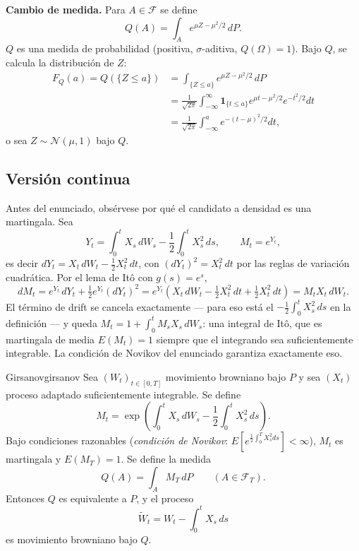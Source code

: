 \documentclass[11pt, a4paper]{article}
\begin{document}
\textbf{Cambio de medida.} Para $A \in \mathcal{F}$ se define
$$ Q(A) = \int_A e^{\mu Z - \mu^2/2} \, dP. $$
$Q$ es una medida de probabilidad (positiva, $\sigma$-aditiva, $Q(\Omega) = 1$). Bajo $Q$,
se calcula la distribución de $Z$:
\begin{align*}
F_Q(a) = Q(\{Z \le a\}) &= \int_{\{Z \le a\}} e^{\mu Z - \mu^2/2} \, dP \\
&= \frac{1}{\sqrt{2\pi}} \int_{-\infty}^\infty \mathbf{1}_{\{t \le a\}} e^{\mu t - \mu^2/2}
e^{-t^2/2} dt \\
&= \frac{1}{\sqrt{2\pi}} \int_{-\infty}^a e^{-(t - \mu)^2/2} dt,
\end{align*}
o sea $Z \sim \mathcal{N}(\mu, 1)$ bajo $Q$.

\subsection{Versión continua}

Antes del enunciado, obsérvese por qué el candidato a densidad es una martingala. Sea
$$ Y_t = \int_0^t X_s \, dW_s - \frac{1}{2} \int_0^t X_s^2 \, ds, \qquad M_t = e^{Y_t}, $$
es decir $dY_t = X_t \, dW_t - \tfrac{1}{2} X_t^2 \, dt$, con $(dY_t)^2 = X_t^2 \, dt$ por las
reglas de variación cuadrática. Por el lema de Itô con $g(s) = e^s$,
$$ dM_t = e^{Y_t} \, dY_t + \tfrac{1}{2} e^{Y_t} (dY_t)^2 = e^{Y_t} \left( X_t \, dW_t -
\tfrac{1}{2} X_t^2 \, dt + \tfrac{1}{2} X_t^2 \, dt \right) = M_t X_t \, dW_t. $$
El término de drift se cancela exactamente — para eso está el $-\tfrac{1}{2} \int_0^t X_s^2
\, ds$ en la definición — y queda $M_t = 1 + \int_0^t M_s X_s \, dW_s$: una integral de Itô,
que es martingala de media $E(M_t) = 1$ siempre que el integrando sea suficientemente
integrable. La condición de Novikov del enunciado garantiza exactamente eso.

\begin{teorema}{Girsanov}{girsanov}
Sea $(W_t)_{t \in [0, T]}$ movimiento browniano bajo $P$ y sea $(X_t)$ proceso adaptado
suficientemente integrable. Se define
$$ M_t = \exp\!\left( \int_0^t X_s \, dW_s - \frac{1}{2} \int_0^t X_s^2 \, ds \right). $$
Bajo condiciones razonables (\emph{condición de Novikov}: $E[e^{\tfrac{1}{2} \int_0^T X_s^2 ds}]
< \infty$), $M_t$ es martingala y $E(M_T) = 1$. Se define la medida
$$ Q(A) = \int_A M_T \, dP \qquad (A \in \mathcal{F}_T). $$
Entonces $Q$ es equivalente a $P$, y el proceso
$$ \widetilde{W}_t = W_t - \int_0^t X_s \, ds $$
es movimiento browniano bajo $Q$.
\end{teorema}
\end{document}
